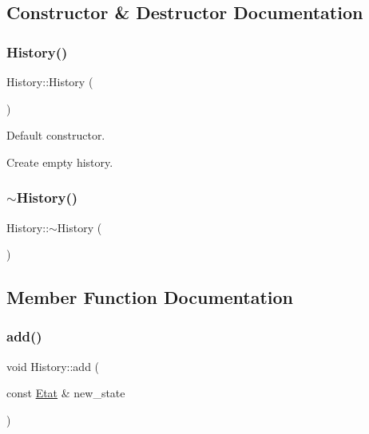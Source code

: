 \subsection{Constructor \& Destructor Documentation}
\mbox{\label{class_history_afba1384643f419d079e78adb1497f741}} 
\subsubsection{\texorpdfstring{History()}{History()}}
{\footnotesize\ttfamily History\+::\+History (\begin{DoxyParamCaption}{ }\end{DoxyParamCaption})}



Default constructor. 

Create empty history. \mbox{\label{class_history_a5b00b64a1ddee04e60d5a3b517fd6d4c}} 
\subsubsection{\texorpdfstring{$\sim$\+History()}{~History()}}
{\footnotesize\ttfamily History\+::$\sim$\+History (\begin{DoxyParamCaption}{ }\end{DoxyParamCaption})}



\subsection{Member Function Documentation}
\mbox{\label{class_history_a90222df7f73ae9cfda56bdb66cb1985e}} 
\subsubsection{\texorpdfstring{add()}{add()}}
{\footnotesize\ttfamily void History\+::add (\begin{DoxyParamCaption}\item[{const \hyperlink{class_etat}{Etat} \&}]{new\+\_\+state }\end{DoxyParamCaption})}



